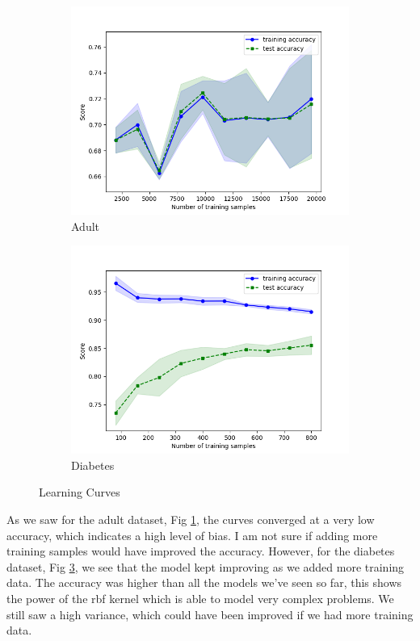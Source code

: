 \documentclass[11pt, twocolumn]{article}
\begin{document}
    \begin{figure}[!htbp]
        \begin{subfigure}{.24\textwidth}
            \centering
            \includegraphics[width=.9\textwidth]{learnings_Adult_SVC_RBF_optimized}
            \caption{Adult}
            \label{fig:learnings_Adult_SVC_RBF_optimized}
        \end{subfigure}
        \begin{subfigure}{.24\textwidth}
            \centering
            \includegraphics[width=.9\textwidth]{learnings_Diabetes_SVC_RBF_optimized}
            \caption{Diabetes}
            \label{fig:learnings_Diabetes_SVC_RBF_optimized}
        \end{subfigure}
        \caption{Learning Curves}
    \end{figure}
    \FloatBarrier

    As we saw for the adult dataset, Fig \ref{fig:learnings_Adult_SVC_RBF_optimized}, the curves converged at a very low accuracy, which indicates a high level of bias. I am not sure if adding more training samples would have improved the accuracy. However, for the diabetes dataset, Fig \ref{fig:learnings_Diabetes_SVC_RBF_optimized}, we see that the model kept improving as we added more training data. The accuracy was higher than all the models we've seen so far, this shows the power of the rbf kernel which is able to model very complex problems. We still saw a high variance, which could have been improved if we had more training data.
\end{document}
